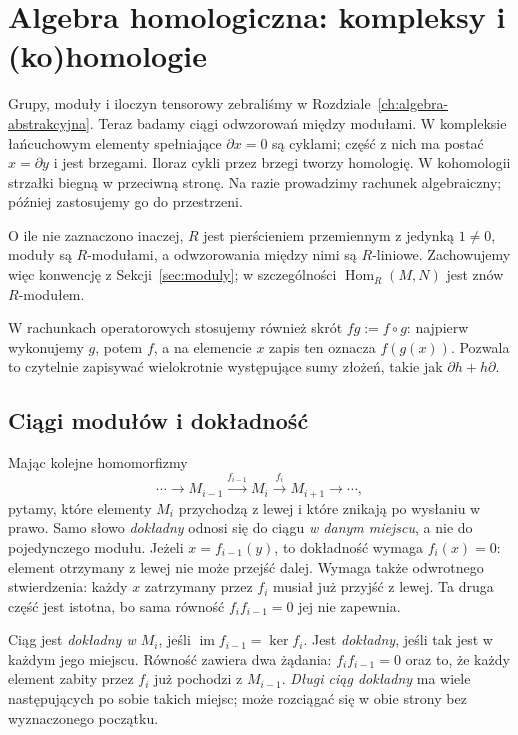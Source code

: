 \chapter{Algebra homologiczna: kompleksy i (ko)homologie}
\label{ch:algebra-homologiczna}

Grupy, moduły i iloczyn tensorowy zebraliśmy w
Rozdziale~\ref{ch:algebra-abstrakcyjna}.
Teraz badamy ciągi odwzorowań między modułami.
W kompleksie łańcuchowym elementy spełniające
$\partial x=0$ są cyklami; część z nich ma postać
$x=\partial y$ i jest brzegami. Iloraz cykli
przez brzegi tworzy homologię. W kohomologii
strzałki biegną w przeciwną stronę.
Na razie prowadzimy rachunek algebraiczny;
później zastosujemy go do przestrzeni.

O ile nie zaznaczono inaczej, $R$ jest pierścieniem przemiennym
z jedynką $1\ne0$, moduły są $R$-modułami, a odwzorowania między
nimi są $R$-liniowe. Zachowujemy więc konwencję z
Sekcji~\ref{sec:moduly}; w szczególności
$\operatorname{Hom}_R(M,N)$ jest znów $R$-modułem.

W rachunkach operatorowych stosujemy również skrót
$fg:=f\circ g$: najpierw wykonujemy $g$, potem $f$,
a na elemencie $x$ zapis ten oznacza $f(g(x))$.
Pozwala to czytelnie zapisywać wielokrotnie występujące sumy
złożeń, takie jak $\partial h+h\partial$.

\section{Ciągi modułów i dokładność}
\label{sec:dokladnosc-modulow}

Mając kolejne homomorfizmy
\[
 \cdots\longrightarrow M_{i-1}
 \xrightarrow{f_{i-1}}M_i
 \xrightarrow{f_i}M_{i+1}
 \longrightarrow\cdots,
\]
pytamy, które elementy $M_i$ przychodzą z lewej
i które znikają po wysłaniu w prawo.
Samo słowo \emph{dokładny} odnosi się do
ciągu \emph{w danym miejscu}, a nie do
pojedynczego modułu.
Jeżeli $x=f_{i-1}(y)$, to dokładność wymaga
$f_i(x)=0$: element otrzymany z lewej nie może
przejść dalej. Wymaga także odwrotnego stwierdzenia:
każdy $x$ zatrzymany przez $f_i$ musiał już
przyjść z lewej. Ta druga część jest istotna,
bo sama równość $f_i f_{i-1}=0$ jej nie zapewnia.

\begin{definicja}
\label{def:ciag-dokladny}
Ciąg jest \emph{dokładny w $M_i$}, jeśli
$\operatorname{im}f_{i-1}=\ker f_i$.
Jest \emph{dokładny}, jeśli tak jest
w każdym jego miejscu. Równość zawiera
dwa żądania: $f_i f_{i-1}=0$ oraz to,
że każdy element zabity przez $f_i$
już pochodzi z $M_{i-1}$.
\emph{Długi ciąg dokładny} ma wiele
następujących po sobie takich miejsc;
może rozciągać się w obie strony
bez wyznaczonego początku.
\end{definicja}

